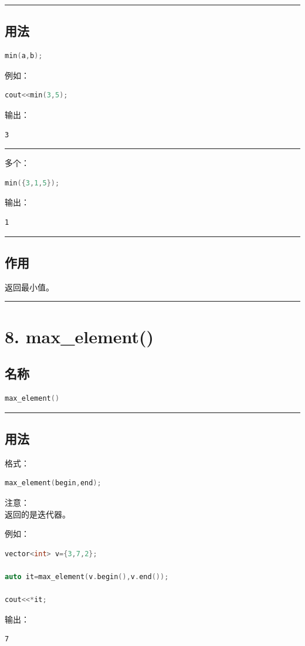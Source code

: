 \documentclass[10pt,twocolumn]{extarticle}
\begin{document}
\noindent\rule{\linewidth}{0.4pt}

\subsection{用法}
\begin{lstlisting}[language=C++]
min(a,b);
\end{lstlisting}
例如：
\begin{lstlisting}[language=C++]
cout<<min(3,5);
\end{lstlisting}
输出：
\begin{lstlisting}
3
\end{lstlisting}

\noindent\rule{\linewidth}{0.4pt}

多个：
\begin{lstlisting}[language=C++]
min({3,1,5});
\end{lstlisting}
输出：
\begin{lstlisting}
1
\end{lstlisting}

\noindent\rule{\linewidth}{0.4pt}

\subsection{作用}
返回最小值。

\noindent\rule{\linewidth}{0.4pt}

\section{8. max\_element()}

\subsection{名称}
\begin{lstlisting}[language=C++]
max_element()
\end{lstlisting}

\noindent\rule{\linewidth}{0.4pt}

\subsection{用法}
格式：
\begin{lstlisting}[language=C++]
max_element(begin,end);
\end{lstlisting}
注意：\\
返回的是迭代器。

例如：
\begin{lstlisting}[language=C++]
vector<int> v={3,7,2};

auto it=max_element(v.begin(),v.end());

cout<<*it;
\end{lstlisting}
输出：
\begin{lstlisting}
7
\end{lstlisting}
\end{document}
